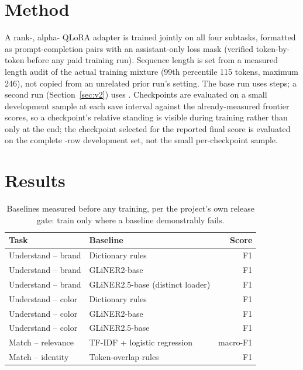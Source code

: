 \documentclass{article}
\begin{document}
\section{Method}
\label{sec:method}
A rank-\LoraRank{}, alpha-\LoraAlpha{} QLoRA adapter is trained jointly on all four subtasks, formatted as prompt-completion pairs with an assistant-only loss mask (verified token-by-token before any paid training run). Sequence length is set from a measured length audit of the actual training mixture (99th percentile 115 tokens, maximum 246), not copied from an unrelated prior run's setting. The base run uses \TrainSteps{} steps; a second run (Section~\ref{sec:v2}) uses \AdapterTwoTrainSteps{}. Checkpoints are evaluated on a small development sample at each save interval against the already-measured frontier scores, so a checkpoint's relative standing is visible during training rather than only at the end; the checkpoint selected for the reported final score is evaluated on the complete \DevSetRows{}-row development set, not the small per-checkpoint sample.

\section{Results}
\label{sec:results}
\begin{table}[t]
\centering
\caption{Baselines measured before any training, per the project's own release gate: train only where a baseline demonstrably fails.}
\label{tab:baselines}
\begin{tabular}{llr}
\toprule
Task & Baseline & Score \\
\midrule
Understand -- brand & Dictionary rules & \RulesBrandFOne{} F1 \\
Understand -- brand & GLiNER2-base & \GlinerTwoBrandFOne{} F1 \\
Understand -- brand & GLiNER2.5-base (distinct loader) & \GlinerTwoFiveBrandFOne{} F1 \\
Understand -- color & Dictionary rules & \RulesColorFOne{} F1 \\
Understand -- color & GLiNER2-base & \GlinerTwoColorFOne{} F1 \\
Understand -- color & GLiNER2.5-base & \GlinerTwoFiveColorFOne{} F1 \\
Match -- relevance & TF-IDF + logistic regression & \RelevanceTfidfMacroFOne{} macro-F1 \\
Match -- identity & Token-overlap rules & \IdentityJaccardFOne{} F1 \\
\bottomrule
\end{tabular}
\end{table}
\end{document}
